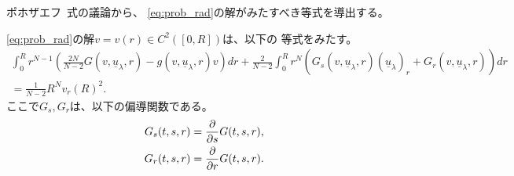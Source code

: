 ポホザエフ\cite{MR0192184}~式の議論から、
\eqref{eq:prob_rad}の解がみたすべき等式を導出する。

\begin{lem}
 \eqref{eq:prob_rad}の解$v = v(r) \in C^2([0, R])$は、以下の
 等式をみたす。
 \begin{multline}
  \int_0^R r^{N-1} \left( \frac{2N}{N-2} G(v, \underline{u}_\lambda,
  r) - g(v, \underline{u}_\lambda, r) v \right) dr
  + \frac{2}{N-2} \int_0^R r^N \left( G_s(v, \underline{u}_\lambda, r)
  (\underline{u}_\lambda)_r + G_r(v, \underline{u}_\lambda, r)
  \right) dr \\ = \frac{1}{N-2} R^N v_r(R)^2. \label{eq:poh_eq}
 \end{multline}
 ここで$G_s, G_r$は、以下の偏導関数である。
 \begin{align*}
  G_s(t, s, r) &= \frac{\partial }{\partial s} G(t, s, r), \\
  G_r(t, s, r) &= \frac{\partial }{\partial r} G(t, s, r).
 \end{align*}
\end{lem}


